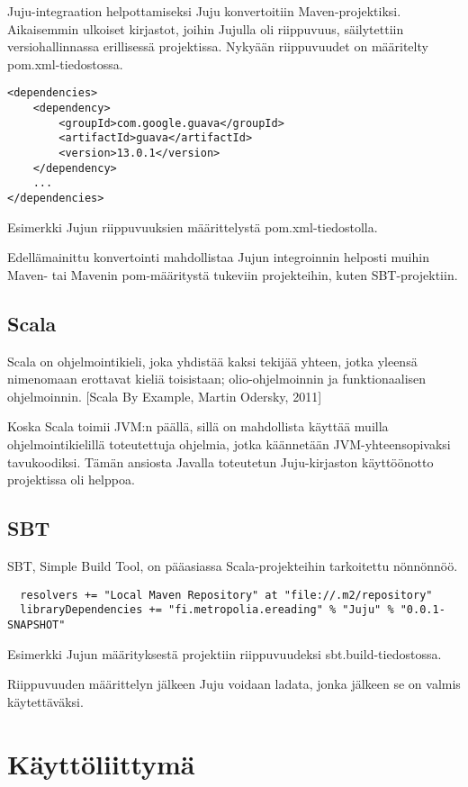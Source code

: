 \documentclass[11pt,a4paper,oneside]{memoir}
\begin{document}
Juju-integraation helpottamiseksi Juju konvertoitiin Maven-projektiksi. Aikaisemmin ulkoiset kirjastot, joihin Jujulla oli riippuvuus, säilytettiin versiohallinnassa erillisessä projektissa. Nykyään riippuvuudet on määritelty pom.xml-tiedostossa.

\begin{verbatim}
<dependencies>
    <dependency>
        <groupId>com.google.guava</groupId>
        <artifactId>guava</artifactId>
        <version>13.0.1</version>
    </dependency>
    ...
</dependencies>
\end{verbatim}
Esimerkki Jujun riippuvuuksien määrittelystä pom.xml-tiedostolla.

Edellämainittu konvertointi mahdollistaa Jujun integroinnin helposti muihin Maven- tai Mavenin pom-määritystä tukeviin projekteihin, kuten SBT-projektiin.

\subsection{Scala}
Scala on ohjelmointikieli, joka yhdistää kaksi tekijää yhteen, jotka yleensä nimenomaan erottavat kieliä toisistaan; olio-ohjelmoinnin ja funktionaalisen ohjelmoinnin. 
\cite[asd]{scala-by-example}
[Scala By Example, Martin Odersky, 2011]

Koska Scala toimii JVM:n päällä, sillä on mahdollista käyttää muilla ohjelmointikielillä toteutettuja ohjelmia, jotka käännetään JVM-yhteensopivaksi tavukoodiksi. Tämän ansiosta Javalla toteutetun Juju-kirjaston käyttöönotto projektissa oli helppoa.

\subsection{SBT}
SBT, Simple Build Tool, on pääasiassa Scala-projekteihin tarkoitettu nönnönnöö.

\begin{program}
  \begin{verbatim}
  resolvers += "Local Maven Repository" at "file://.m2/repository"
  libraryDependencies += "fi.metropolia.ereading" % "Juju" % "0.0.1-SNAPSHOT"
  \end{verbatim}
  \caption{Esimerkki Jujun määrityksestä projektiin riippuvuudeksi sbt.build-tiedostossa.}
\end{program}

Riippuvuuden määrittelyn jälkeen Juju voidaan ladata, jonka jälkeen se on valmis käytettäväksi.

\section{Käyttöliittymä}
\end{document}
